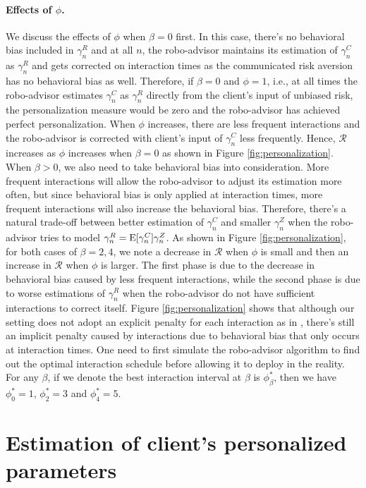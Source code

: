 \paragraph{Effects of $\phi$.} We discuss the effects of $\phi$ when $\beta=0$ first. In this case, there's no behavioral bias included in $\gamma_n^R$ and at all $n$, the robo-advisor maintains its estimation of $\gamma_n^C$ as $\gamma_n^R$ and gets corrected on interaction times as the communicated risk aversion has no behavioral bias as well. Therefore, if $\beta=0$ and $\phi=1$, i.e., at all times the robo-advisor estimates $\gamma_n^C$ as $\gamma_n^R$ directly from the client's input of unbiased risk, the personalization measure would be zero and the robo-advisor has achieved perfect personalization. When $\phi$ increases, there are less frequent interactions and the robo-advisor is corrected with client's input of $\gamma_n^C$ less frequently. Hence, $\mathcal R$ increases as $\phi$ increases when $\beta=0$ as shown in Figure \ref{fig:personalization}. When $\beta>0$, we also need to take behavioral bias into consideration. More frequent interactions will allow the robo-advisor to adjust its estimation more often, but since behavioral bias is only applied at interaction times, more frequent interactions will also increase the behavioral bias. Therefore, there's a natural trade-off between better estimation of $\gamma_n^C$ and smaller $\gamma_n^Z$ when the robo-advisor tries to model $\gamma_n^R=\mathrm{E}[\gamma_n^C]\gamma_n^Z$. As shown in Figure \ref{fig:personalization}, for both cases of $\beta=2,4$, we note a decrease in $\mathcal R$ when $\phi$ is small and then an increase in $\mathcal R$ when $\phi$ is larger. The first phase is due to the decrease in behavioral bias caused by less frequent interactions, while the second phase is due to worse estimations of $\gamma_n^R$ when the robo-advisor do not have sufficient interactions to correct itself. Figure \ref{fig:personalization} shows that although our setting does not adopt an explicit penalty for each interaction as in , there's still an implicit penalty caused by interactions due to behavioral bias that only occurs at interaction times. One need to first simulate the robo-advisor algorithm to find out the optimal interaction schedule before allowing it to deploy in the reality. For any $\beta$, if we denote the best interaction interval at $\beta$ is $\phi_\beta^*$, then we have $\phi_0^*=1$, $\phi_2^*=3$ and $\phi_4^*=5$. 

\section{Estimation of client's personalized parameters}\label{sec:est_exp}

